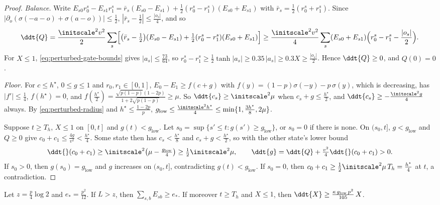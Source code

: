 \begin{proof}
\emph{Balance.} Write $E_{s0}r^s_0-E_{s1}r^s_1=\bar r_s(E_{s0}-E_{s1})+\frac12(r^s_0-r^s_1)(E_{s0}+E_{s1})$ with $\bar r_s=\frac12(r^s_0+r^s_1)$.
Since $|\partial_o(\sigma(-a-o)+\sigma(a-o))|\le\frac12$, $|\bar r_s-\frac12|\le\frac{|o_s|}4$, and so
\[
 \ddt{Q}=\frac{\initscale^2v^2}2\sum_s\Bigl[\bigl(\bar r_s-\tfrac12\bigr)(E_{s0}-E_{s1})+\tfrac12(r^s_0-r^s_1)(E_{s0}+E_{s1})\Bigr]
 \ge\frac{\initscale^2v^2}4\sum_s(E_{s0}+E_{s1})\Bigl(r^s_0-r^s_1-\frac{|o_s|}2\Bigr).
\]
For $X\le1$, \cref{eq:perturbed-gate-bounds} gives $|a_s|\le\frac{73}{64}$, so $r^s_0-r^s_1\ge\frac12\tanh|a_s|\ge0.35\,|a_s|\ge0.3X\ge\frac{|o_s|}2$.
Hence $\ddt{Q}\ge0$, and $Q(0)=0$.

\emph{Floor.} For $c\le h^\star$, $0\le g\le1$ and $r_0,r_1\in[0,1]$, $E_0-E_1\ge f(c+g)$ with $f(y)=(1-p)\sigma(-y)-p\,\sigma(y)$, which is
decreasing, has $|f'|\le\frac14$, $f(h^\star)=0$, and
$f(\frac{h^\star}2)=\frac{\sqrt{p(1-p)}(1-2p)}{1+2\sqrt{p(1-p)}}\ge\mu$. So $\ddt{c_s}\ge\initscale^2\mu$ when $c_s+g\le\frac{h^\star}2$, and
$\ddt{c_s}\ge-\frac{\initscale^2g}4$ always. By \cref{eq:perturbed-radius} and $h^\star\le\frac{1-2p}{p}$,
$g_{\mathrm{low}}\le\frac{\initscale^2h^\star}4\le\min\{1,\frac{3h^\star}8,2\mu\}$.

Suppose $t\ge T_h$, $X\le1$ on $[0,t]$ and $g(t)<g_{\mathrm{low}}$. Let $s_0=\sup\{s'\le t:g(s')\ge g_{\mathrm{low}}\}$, or $s_0=0$ if there is none.
On $(s_0,t]$, $g<g_{\mathrm{low}}$ and $Q\ge0$ give $c_0+c_1\le\frac{4g}{v^2}<\frac{h^\star}4$. Some state then has $c_s<\frac{h^\star}8$ and
$c_s+g<\frac{h^\star}2$, so with the other state's lower bound
\[
 \ddt{}(c_0+c_1)\ge\initscale^2\bigl(\mu-\tfrac{g_{\mathrm{low}}}4\bigr)\ge\tfrac12\initscale^2\mu,\qquad
 \ddt{g}=\ddt{Q}+\tfrac{v^2}4\ddt{}(c_0+c_1)>0 .
\]
If $s_0>0$, then $g(s_0)=g_{\mathrm{low}}$ and $g$ increases on $(s_0,t]$, contradicting $g(t)<g_{\mathrm{low}}$. If $s_0=0$, then
$c_0+c_1\ge\frac12\initscale^2\mu\,T_h=\frac{h^\star}4$ at $t$, a contradiction.
\end{proof}

\begin{lemma}
\label{lem:perturbed-grow}
Let $z=\frac p4\log2$ and $e_\ast=\frac{p^2}{12}$. If $L>z$, then $\sum_{s,b}E_{sb}\ge e_\ast$. If moreover $t\ge T_h$ and $X\le1$, then
$\ddt{X}\ge\frac{\kappa\,g_{\mathrm{low}}\,p^2}{105}\,X$.
\end{lemma}


